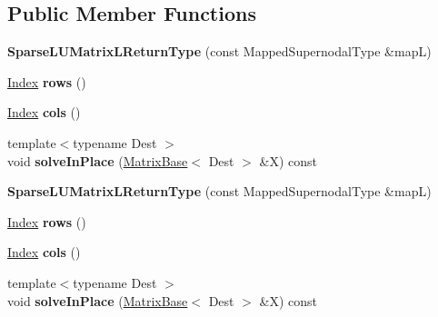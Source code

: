 \subsection*{Public Member Functions}
\begin{DoxyCompactItemize}
\item 
\mbox{\label{struct_eigen_1_1_sparse_l_u_matrix_l_return_type_aadb358a4affbe51e1b6e0a67077266f3}} 
{\bfseries Sparse\+L\+U\+Matrix\+L\+Return\+Type} (const Mapped\+Supernodal\+Type \&mapL)
\item 
\mbox{\label{struct_eigen_1_1_sparse_l_u_matrix_l_return_type_afd8d628e1e8c9a952618ec13184f5081}} 
\hyperlink{namespace_eigen_a62e77e0933482dafde8fe197d9a2cfde}{Index} {\bfseries rows} ()
\item 
\mbox{\label{struct_eigen_1_1_sparse_l_u_matrix_l_return_type_ac801def49a9e8a3ac03625b8c47e5a56}} 
\hyperlink{namespace_eigen_a62e77e0933482dafde8fe197d9a2cfde}{Index} {\bfseries cols} ()
\item 
\mbox{\label{struct_eigen_1_1_sparse_l_u_matrix_l_return_type_ab164cb4d7d0f0b4402fc8d4b4243a1c2}} 
{\footnotesize template$<$typename Dest $>$ }\\void {\bfseries solve\+In\+Place} (\hyperlink{group___core___module_class_eigen_1_1_matrix_base}{Matrix\+Base}$<$ Dest $>$ \&X) const
\item 
\mbox{\label{struct_eigen_1_1_sparse_l_u_matrix_l_return_type_aadb358a4affbe51e1b6e0a67077266f3}} 
{\bfseries Sparse\+L\+U\+Matrix\+L\+Return\+Type} (const Mapped\+Supernodal\+Type \&mapL)
\item 
\mbox{\label{struct_eigen_1_1_sparse_l_u_matrix_l_return_type_afd8d628e1e8c9a952618ec13184f5081}} 
\hyperlink{namespace_eigen_a62e77e0933482dafde8fe197d9a2cfde}{Index} {\bfseries rows} ()
\item 
\mbox{\label{struct_eigen_1_1_sparse_l_u_matrix_l_return_type_ac801def49a9e8a3ac03625b8c47e5a56}} 
\hyperlink{namespace_eigen_a62e77e0933482dafde8fe197d9a2cfde}{Index} {\bfseries cols} ()
\item 
\mbox{\label{struct_eigen_1_1_sparse_l_u_matrix_l_return_type_ab164cb4d7d0f0b4402fc8d4b4243a1c2}} 
{\footnotesize template$<$typename Dest $>$ }\\void {\bfseries solve\+In\+Place} (\hyperlink{group___core___module_class_eigen_1_1_matrix_base}{Matrix\+Base}$<$ Dest $>$ \&X) const
\end{DoxyCompactItemize}
